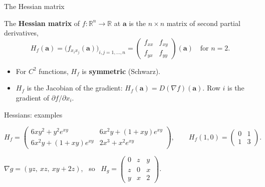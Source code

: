 \documentclass[10pt]{wosm-slides}
\newcommand{\R}{\mathbb{R}}
\newcommand{\va}{\mathbf{a}}
\begin{document}
\begin{frame}{The Hessian matrix}
  \begin{definition}
    The \textbf{Hessian matrix} of $f\colon \R^n \to \R$ at $\va$ is the $n \times n$ matrix of second
    partial derivatives,
    \[ H_f(\va) = \bigl(f_{x_i x_j}(\va)\bigr)_{i, j = 1, \dots, n}
       = \begin{pmatrix} f_{xx} & f_{xy} \\ f_{yx} & f_{yy} \end{pmatrix}(\va) \quad\text{for } n = 2 . \]
  \end{definition}
  \pause
  \begin{itemize}
    \item For $C^2$ functions, $H_f$ is \textbf{symmetric} (Schwarz).
    \item $H_f$ is the Jacobian of the gradient: $H_f(\va) = D(\nabla f)(\va)$. Row $i$ is the gradient
      of $\partial f / \partial x_i$.
  \end{itemize}
\end{frame}

\begin{frame}{Hessians: examples}
  \begin{example}[$f = x^3 y^2 + e^{xy}$, from the start of the lecture]
    \[ H_f = \begin{pmatrix} 6xy^2 + y^2 e^{xy} & 6x^2 y + (1 + xy) e^{xy} \\
                             6x^2 y + (1 + xy) e^{xy} & 2x^3 + x^2 e^{xy} \end{pmatrix}, \qquad
       H_f(1, 0) = \begin{pmatrix} 0 & 1 \\ 1 & 3 \end{pmatrix} . \]
  \end{example}
  \pause
  \begin{example}[Three variables: $g = xyz + z^2$]
    $\nabla g = (yz, \ xz, \ xy + 2z)$, \ so \
    $H_g = \begin{pmatrix} 0 & z & y \\ z & 0 & x \\ y & x & 2 \end{pmatrix}$.
  \end{example}
\end{frame}
\end{document}
